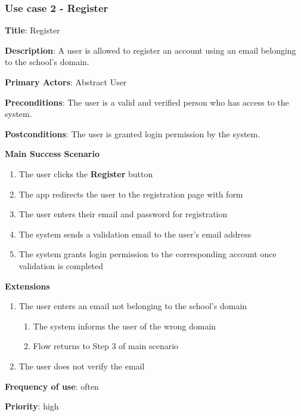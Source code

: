 \documentclass[singlespacing,12pt,parskip,headsepline,consistentlayout]{article}
\begin{document}
\pagebreak
\subsubsection{Use case 2 - Register}
\begin{flushleft}
\vspace{0.2cm}
\noalign \hline
\vspace{0.2cm}
{\bfseries Title}: {Register}

{\bfseries Description}: {A user is allowed to register an account using an email belonging to the school’s domain.}

{\bfseries Primary Actors}: {Abstract User}

{\bfseries Preconditions}: The user is a valid and verified person who has access to the system.

{\bfseries Postconditions}: {The user is granted login permission by the system.}

{\bfseries Main Success Scenario}

\begin{enumerate}
      \item The user clicks the {\bfseries Register} button
      \item The app redirects the user to the registration page with form
      \item The user enters their email and password for registration
      \item The system sends a validation email to the user’s email address
      \item The system grants login permission to the corresponding account once validation is completed
\end{enumerate}
 
{\bfseries Extensions}

\begin{enumerate}
  \item The user enters an email not belonging to the school’s domain
  \begin{enumerate}
      \item The system informs the user of the wrong domain
      \item Flow returns to Step 3 of main scenario
  \end{enumerate}
  \item The user does not verify the email
\end{enumerate}

{\bfseries Frequency of use}: often

{\bfseries Priority}: high

\end{flushleft}
\end{document}
